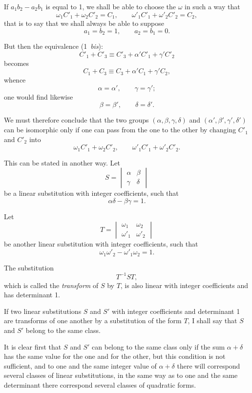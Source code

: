 \documentclass{article}
\begin{document}
If $a_{1}b_{2} - a_{2}b_{1}$ is equal to 1, we shall be able to choose the $\omega$ in such a way that
\[ \omega_{1}C'_{1} + \omega_{2}C'_{2} = C_{1}, \qquad \omega'_{1}C'_{1} + \omega'_{2}C'_{2} = C_{2}, \]
that is to say that we shall always be able to suppose
\[ a_{1} = b_{2} = 1, \qquad a_{2} = b_{1} = 0. \]

But then the equivalence (1~\emph{bis}):
\[ C'_{1} + C'_{3} \equiv C'_{3} + \alpha'C'_{1} + \gamma'C'_{2} \]
becomes
\[ C_{1} + C_{3} \equiv C_{3} + \alpha'C_{1} + \gamma'C_{2}, \]
whence
\[ \alpha = \alpha', \qquad \gamma = \gamma'; \]
one would find likewise
\[ \beta = \beta', \qquad \delta = \delta'. \]

We must therefore conclude that the two groups $(\alpha, \beta, \gamma, \delta)$ and $(\alpha', \beta', \gamma', \delta')$ can be isomorphic only if one can pass from the one to the other by changing $C'_{1}$ and $C'_{2}$ into
\[ \omega_{1}C'_{1} + \omega_{2}C'_{2}, \qquad \omega'_{1}C'_{1} + \omega'_{2}C'_{2}. \]

This can be stated in another way.
Let
\[ S = \begin{vmatrix} \alpha & \beta \\[1ex] \gamma & \delta \end{vmatrix} \]
be a linear substitution with integer coefficients, such that
\[ \alpha\delta - \beta\gamma = 1. \]

Let
\[ T = \begin{vmatrix} \omega_{1} & \omega_{2} \\[1ex] \omega'_{1} & \omega'_{2} \end{vmatrix} \]
be another linear substitution with integer coefficients, such that
\[ \omega_{1}\omega'_{2} - \omega'_{1}\omega_{2} = 1. \]

The substitution
\[ T^{-1}ST, \]
which is called the \emph{transform} of $S$ by $T$, is also linear with integer coefficients and has determinant 1.

If two linear substitutions $S$ and $S'$ with integer coefficients and determinant 1 are transforms of one another by a substitution of the form $T$, I shall say that $S$ and $S'$ belong to the same class.

It is clear first that $S$ and $S'$ can belong to the same class only if the sum $\alpha + \delta$ has the same value for the one and for the other, but this condition is not sufficient, and to one and the same integer value of $\alpha + \delta$ there will correspond several classes of linear substitutions, in the same way as to one and the same determinant there correspond several classes of quadratic forms.
\end{document}

